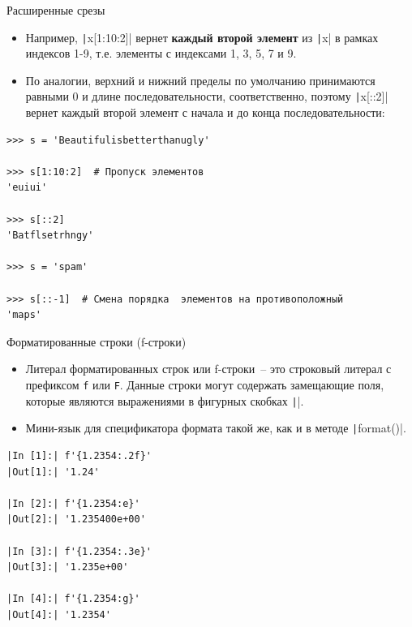 \documentclass[aspectratio=169, mathserif]{beamer}%
\begin{document}
\begin{frame}[fragile]{Расширенные срезы}
\scriptsize
\begin{itemize}
\item Например, \texttt|x[1:10:2]| вернет \textcolor{extraorange}{\textbf{каждый второй элемент}} из \texttt|x| в рамках индексов 1-9, т.е. элементы с индексами 1, 3, 5, 7 и 9. 

\item По аналогии, верхний и нижний пределы по умолчанию принимаются равными 0 и длине последовательности, соответственно, поэтому \texttt|x[::2]| вернет каждый второй элемент с начала и до конца последовательности:
\end{itemize}

\begin{verbatim}
>>> s = 'Beautifulisbetterthanugly'

>>> s[1:10:2]  # Пропуск элементов
'euiui'

>>> s[::2]
'Batflsetrhngy'

>>> s = 'spam'  

>>> s[::-1]  # Смена порядка  элементов на противоположный 
'maps'
\end{verbatim}
\vfill
\end{frame}


\begin{frame}[fragile]{Форматированные строки (f-строки)}
\scriptsize
\begin{itemize}
\item Литерал форматированных строк или f-строки~-- это строковый литерал с префиксом \texttt{f} или \texttt{F}. Данные строки могут содержать замещающие поля, которые являются выражениями в фигурных скобках \texttt|{}|.

\item Мини-язык для спецификатора формата такой же, как и в методе \texttt|format()|.
\end{itemize}

\begin{verbatim}
|In [1]:| f'{1.2354:.2f}'
|Out[1]:| '1.24'

|In [2]:| f'{1.2354:e}'
|Out[2]:| '1.235400e+00'

|In [3]:| f'{1.2354:.3e}'
|Out[3]:| '1.235e+00'

|In [4]:| f'{1.2354:g}'
|Out[4]:| '1.2354'
\end{verbatim}

\vfill
\end{frame}
\end{document}
